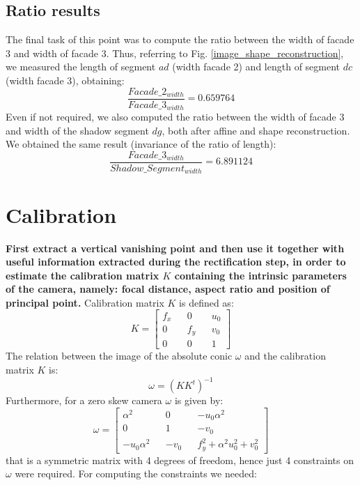 \documentclass[11pt, oneside]{article}
\begin{document}
\subsection{Ratio results}
The final task of this point was to compute the ratio between the width of facade 3 and width of facade 3. Thus, referring to Fig. \ref{image_shape_reconstruction}, we measured the length of segment $ad$ (width facade 2) and length of segment $dc$ (width facade 3), obtaining:
$$\frac{Facade\_2_{width}}{Facade\_3_{width}} = 0.659764$$
Even if not required, we also computed the ratio between the width of facade 3 and width of the shadow segment $dg$, both after affine and shape reconstruction. We obtained the same result (invariance of the ratio of length):
$$\frac{Facade\_3_{width}}{Shadow\_Segment_{width}} = 6.891124$$


\section{Calibration}
\textbf{First extract a vertical vanishing point and then use it together with useful information extracted during the rectification step, in order to estimate the calibration matrix $K$ containing the intrinsic parameters of the camera, namely: focal distance, aspect ratio and position of principal point.} \hfill \break
Calibration matrix $K$ is defined as:
\begin{equation} \label{keq}
	K =
	\begin{bmatrix}
		f_x  && 0 && u_0 \\ 0 && f_y && v_0 \\ 0 && 0 && 1
	\end{bmatrix}
\end{equation}
The relation between the image of the absolute conic $\omega$ and the calibration matrix $K$ is:
\begin{equation}
	\label{eqn:omega_K}
	\omega = (KK^t)^{-1}
\end{equation}
Furthermore, for a zero skew camera $\omega$ is given by:
\begin{equation}
	\label{eqn:omega}
	\omega = 
	\begin{bmatrix}
		\alpha^2 && 0 && -u_0 \alpha^2 \\ 0 && 1 && -v_0 \\  -u_0 \alpha^2 && -v_0 && f_y^2 +\alpha^2 u_0^2 + v_0^2
	\end{bmatrix}
\end{equation}
that is a symmetric matrix with 4 degrees of freedom, hence just 4 constraints on $\omega$ were required. For computing the constraints we needed:
\end{document}
